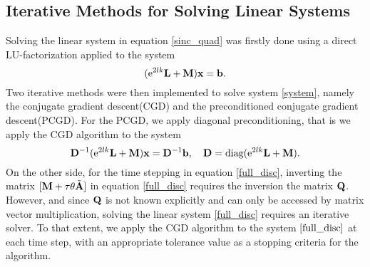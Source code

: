 \subsection{Iterative Methods for Solving Linear Systems}
Solving the linear system in equation \eqref{sinc_quad} was firstly done using a direct LU-factorization applied to the system 
\begin{equation} \label{system}
(\text{e}^{2lk}\mathbf{L}+\mathbf{M})\mathbf{x} = \mathbf{b}.
\end{equation}
Two iterative methods were then implemented to solve system \eqref{system}, namely the conjugate gradient descent(CGD) and the preconditioned conjugate gradient descent(PCGD). For the PCGD, we apply diagonal preconditioning, that is we apply the CGD algorithm to the system
\begin{equation*}
\mathbf{D}^{-1}(\text{e}^{2lk}\mathbf{L}+\mathbf{M})\mathbf{x} = \mathbf{D}^{-1}\mathbf{b}, \quad  \mathbf{D} = \text{diag}(\text{e}^{2lk}\mathbf{L}+\mathbf{M}). 
\end{equation*}
On the other side, for the time stepping in equation \eqref{full_disc}, inverting the matrix $[\mathbf{M}+\tau\theta\tilde{\mathbf{A}}]$ in equation \eqref{full_disc} requires the inversion the matrix $\mathbf{Q}$. However, and since $\mathbf{Q}$ is not known explicitly and can only be accessed by matrix vector multiplication,  solving the linear system \eqref{full_disc} requires an iterative solver. To that extent, we apply the CGD algorithm to the system $\eqref{full_disc}$ at each time step, with an appropriate tolerance value as a stopping criteria for the algorithm.